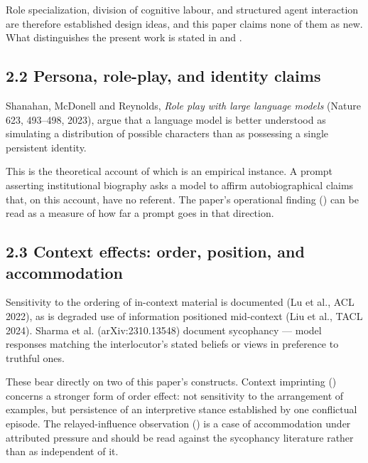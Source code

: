 Role specialization, division of cognitive labour, and structured agent interaction are therefore established design ideas, and this paper claims none of them as new. What distinguishes the present work is stated in  and .


\subsection*{2.2 Persona, role-play, and identity claims}
\label{sec:en:2.2}

\gcheck{} Shanahan, McDonell and Reynolds, \emph{Role play with large language models} (Nature 623, 493–498, 2023), argue that a language model is better understood as simulating a distribution of possible characters than as possessing a single persistent identity.
\nocite{shanahan2023roleplay}

This is the theoretical account of which  is an empirical instance. A prompt asserting institutional biography asks a model to affirm autobiographical claims that, on this account, have no referent. The paper's operational finding () can be read as a measure of how far a prompt goes in that direction.


\subsection*{2.3 Context effects: order, position, and accommodation}
\label{sec:en:2.3}

\gcheck{} Sensitivity to the ordering of in-context material is documented (Lu et al., ACL 2022), as is degraded use of information positioned mid-context (Liu et al., TACL 2024). \gcheck{} Sharma et al. (arXiv:2310.13548) document sycophancy — model responses matching the interlocutor's stated beliefs or views in preference to truthful ones.
\nocite{lu2022promptorder,liu2024lostmiddle,sharma2023sycophancy}

These bear directly on two of this paper's constructs. Context imprinting () concerns a stronger form of order effect: not sensitivity to the arrangement of examples, but persistence of an interpretive stance established by one conflictual episode. The relayed-influence observation () is a case of accommodation under attributed pressure and should be read against the sycophancy literature rather than as independent of it.


